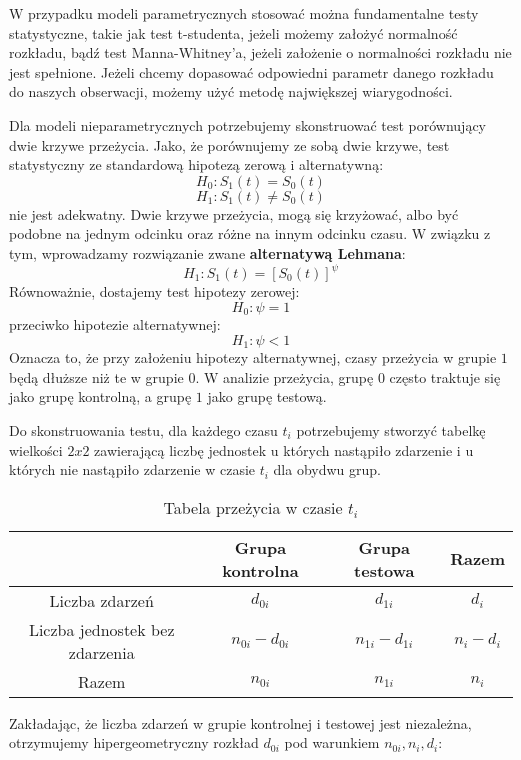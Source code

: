 \documentclass[]{pracamgr}
\begin{document}
W przypadku modeli parametrycznych stosować można fundamentalne testy statystyczne, takie jak test t-studenta, jeżeli możemy założyć normalność rozkładu, bądź test Manna-Whitney'a, jeżeli założenie o normalności rozkładu nie jest spełnione. Jeżeli chcemy dopasować odpowiedni parametr danego rozkładu do naszych obserwacji, możemy użyć metodę największej wiarygodności.

Dla modeli nieparametrycznych potrzebujemy skonstruować test porównujący dwie krzywe przeżycia. Jako, że porównujemy ze sobą dwie krzywe, test statystyczny ze standardową hipotezą zerową i alternatywną:
$$H_0: S_1(t) = S_0(t)$$
$$H_1: S_1(t) \neq S_0(t)$$
nie jest adekwatny. Dwie krzywe przeżycia, mogą się krzyżować, albo być podobne na jednym odcinku oraz różne na innym odcinku czasu. W związku z tym, wprowadzamy rozwiązanie zwane \textbf{alternatywą Lehmana}:
$$H_1: S_1(t) = [S_0(t)]^\psi$$
Równoważnie, dostajemy test hipotezy zerowej:
\begin{equation}
H_0: \psi = 1
\end{equation}
przeciwko hipotezie alternatywnej:
\begin{equation}
H_1: \psi < 1
\end{equation}
Oznacza to, że przy założeniu hipotezy alternatywnej, czasy przeżycia w grupie $1$ będą dłuższe niż te w grupie $0$. W analizie przeżycia, grupę $0$ często traktuje się jako grupę kontrolną, a grupę $1$ jako grupę testową. 

Do skonstruowania testu, dla każdego czasu $t_i$ potrzebujemy stworzyć tabelkę wielkości $2x2$ zawierającą liczbę jednostek u których nastąpiło zdarzenie i u których nie nastąpiło zdarzenie w czasie $t_i$ dla obydwu grup.

\begin{table}[ht] 
\caption{Tabela przeżycia w czasie $t_i$} 
\centering 
\begin{tabular}{c c c | c}
\hline\hline                        
& Grupa kontrolna & Grupa testowa & Razem \\ [0.5ex]
\hline                   
Liczba zdarzeń & $d_{0i}$ & $d_{1i}$ & $d_{i}$ \\ 
Liczba jednostek bez zdarzenia  & $n_{0i} - d_{0i}$ & $n_{1i} - d_{1i}$ & $n_i - d_i$ \\   
\hline
Razem & $n_{0i}$ & $n_{1i}$ & $n_i$ \\ 
\hline  
\end{tabular} \label{table:przezycie}
\end{table} 

Zakładając, że liczba zdarzeń w grupie kontrolnej i testowej jest niezależna, otrzymujemy hipergeometryczny rozkład $d_{0i}$ pod warunkiem $n_{0i}, n_i, d_i$:
\end{document}
